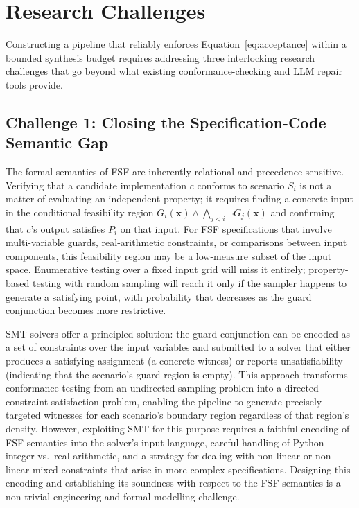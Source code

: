 \section{Research Challenges}
\label{sec:intro:challenges}

Constructing a pipeline that reliably enforces Equation~\eqref{eq:acceptance} within a bounded synthesis budget requires addressing three interlocking research challenges that go beyond what existing conformance-checking and LLM repair tools provide.

\subsection*{Challenge 1: Closing the Specification-Code Semantic Gap}

The formal semantics of FSF are inherently relational and precedence-sensitive.  Verifying that a candidate implementation $c$ conforms to scenario $S_i$ is not a matter of evaluating an independent property; it requires finding a concrete input in the conditional feasibility region $G_i(\mathbf{x}) \wedge \bigwedge_{j < i} \neg G_j(\mathbf{x})$ and confirming that $c$'s output satisfies $P_i$ on that input.  For FSF specifications that involve multi-variable guards, real-arithmetic constraints, or comparisons between input components, this feasibility region may be a low-measure subset of the input space.  Enumerative testing over a fixed input grid will miss it entirely; property-based testing with random sampling \citep{claessen2000quickcheck} will reach it only if the sampler happens to generate a satisfying point, with probability that decreases as the guard conjunction becomes more restrictive.

SMT solvers \citep{demoura2008z3,barrett2018smt} offer a principled solution: the guard conjunction can be encoded as a set of constraints over the input variables and submitted to a solver that either produces a satisfying assignment (a concrete witness) or reports unsatisfiability (indicating that the scenario's guard region is empty).  This approach transforms conformance testing from an undirected sampling problem into a directed constraint-satisfaction problem, enabling the pipeline to generate precisely targeted witnesses for each scenario's boundary region regardless of that region's density.  However, exploiting SMT for this purpose requires a faithful encoding of FSF semantics into the solver's input language, careful handling of Python integer vs.\ real arithmetic, and a strategy for dealing with non-linear or non-linear-mixed constraints that arise in more complex specifications.  Designing this encoding and establishing its soundness with respect to the FSF semantics is a non-trivial engineering and formal modelling challenge.

